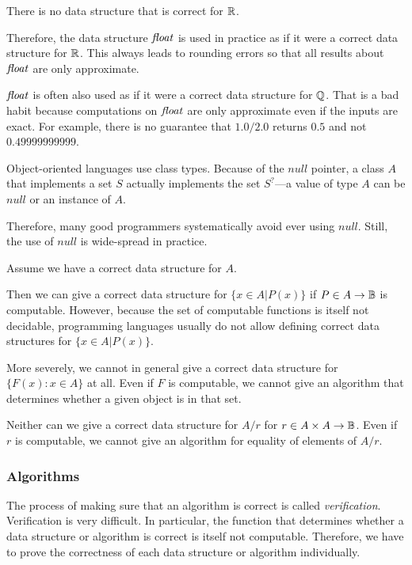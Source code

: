 \begin{example}
There is no data structure that is correct for $\mathbb{R}$.

Therefore, the data structure $\mathit{float}$ is used in practice as if it were a correct data structure for $\mathbb{R}$.
This always leads to rounding errors so that all results about $\mathit{float}$ are only approximate.

$\mathit{float}$ is often also used as if it were a correct data structure for $\mathbb{Q}$.
That is a bad habit because computations on $\mathit{float}$ are only approximate even if the inputs are exact.
For example, there is no guarantee that $1.0/2.0$ returns $0.5$ and not $0.49999999999$.
\end{example}

\begin{example}
Object-oriented languages use class types.
Because of the $null$ pointer, a class $A$ that implements a set $S$ actually implements the set $S^?$---a value of type $A$ can be $null$ or an instance of $A$.

Therefore, many good programmers systematically avoid ever using $null$.
Still, the use of $null$ is wide-spread in practice.
\end{example}

\begin{example}
Assume we have a correct data structure for $A$.
\medskip

Then we can give a correct data structure for $\{x\in A|P(x)\}$ if $P\in A \to \mathbb{B}$ is computable.
However, because the set of computable functions is itself not decidable, programming languages usually do not allow defining correct data structures for $\{x\in A|P(x)\}$.

More severely, we cannot in general give a correct data structure for $\{F(x):x\in A\}$ at all.
Even if $F$ is computable, we cannot give an algorithm that determines whether a given object is in that set.

Neither can we give a correct data structure for $A/r$ for $r\in A\times A\to \mathbb{B}$.
Even if $r$ is computable, we cannot give an algorithm for equality of elements of $A/r$.
\end{example}

\subsubsection{Algorithms}

The process of making sure that an algorithm is correct is called \emph{verification}.
Verification is very difficult.
In particular, the function that determines whether a data structure or algorithm is correct is itself not computable.
Therefore, we have to prove the correctness of each data structure or algorithm individually.


